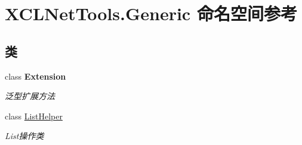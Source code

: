 \hypertarget{namespace_x_c_l_net_tools_1_1_generic}{}\section{X\+C\+L\+Net\+Tools.\+Generic 命名空间参考}
\label{namespace_x_c_l_net_tools_1_1_generic}
\subsection*{类}
\begin{DoxyCompactItemize}
\item 
class {\bfseries Extension}
\begin{DoxyCompactList}\small\item\em 泛型扩展方法 \end{DoxyCompactList}\item 
class \hyperlink{class_x_c_l_net_tools_1_1_generic_1_1_list_helper}{List\+Helper}
\begin{DoxyCompactList}\small\item\em List操作类 \end{DoxyCompactList}\end{DoxyCompactItemize}
